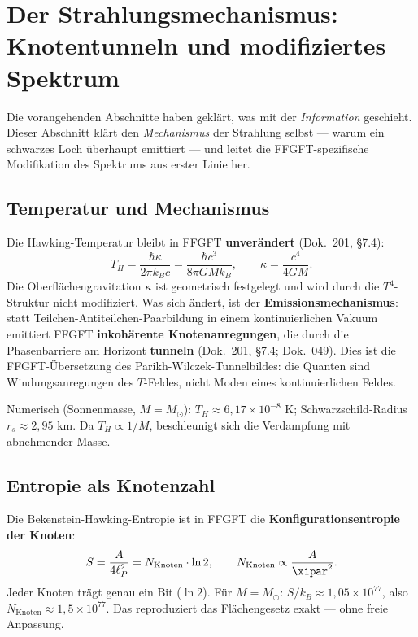 \section{Der Strahlungsmechanismus: Knotentunneln und modifiziertes Spektrum}

Die vorangehenden Abschnitte haben geklärt, was mit der \emph{Information} geschieht. Dieser Abschnitt klärt den \emph{Mechanismus} der Strahlung selbst --- warum ein schwarzes Loch überhaupt emittiert --- und leitet die FFGFT-spezifische Modifikation des Spektrums aus erster Linie her.

\subsection{Temperatur und Mechanismus}

Die Hawking-Temperatur bleibt in FFGFT \textbf{unverändert} (Dok.~201, §7.4):
\begin{equation}
  T_H = \frac{\hbar \kappa}{2\pi k_B c} = \frac{\hbar c^3}{8\pi G M k_B},
  \qquad \kappa = \frac{c^4}{4GM}.
\end{equation}
Die Oberflächengravitation $\kappa$ ist geometrisch festgelegt und wird durch die $T^4$-Struktur nicht modifiziert. Was sich ändert, ist der \textbf{Emissionsmechanismus}: statt Teilchen-Antiteilchen-Paarbildung in einem kontinuierlichen Vakuum emittiert FFGFT \textbf{inkohärente Knotenanregungen}, die durch die Phasenbarriere am Horizont \textbf{tunneln} (Dok.~201, §7.4; Dok.~049). Dies ist die FFGFT-Übersetzung des Parikh-Wilczek-Tunnelbildes: die Quanten sind Windungsanregungen des $T$-Feldes, nicht Moden eines kontinuierlichen Feldes.

Numerisch (Sonnenmasse, $M = M_\odot$): $T_H \approx 6{,}17 \times 10^{-8}$ K; Schwarzschild-Radius $r_s \approx 2{,}95$ km. Da $T_H \propto 1/M$, beschleunigt sich die Verdampfung mit abnehmender Masse.

\subsection{Entropie als Knotenzahl}

Die Bekenstein-Hawking-Entropie ist in FFGFT die \textbf{Konfigurationsentropie der Knoten}:
\begin{equation}
  S = \frac{A}{4 \ell_P^2} = N_\text{Knoten} \cdot \ln 2,
  \qquad N_\text{Knoten} \propto \frac{A}{\xipar^2}.
\end{equation}
Jeder Knoten trägt genau ein Bit ($\ln 2$). Für $M = M_\odot$: $S/k_B \approx 1{,}05 \times 10^{77}$, also $N_\text{Knoten} \approx 1{,}5 \times 10^{77}$. Das reproduziert das Flächengesetz exakt --- ohne freie Anpassung.

